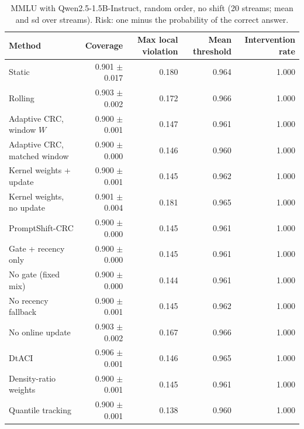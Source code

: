 \begin{table}[H]
\centering
\small
\caption{MMLU with Qwen2.5-1.5B-Instruct, random order, no shift (20 streams; mean and sd over streams). Risk: one minus the probability of the correct answer.}
\label{tab:mmlu_iid}
\begin{tabular}{lrrrr}
\toprule
Method & Coverage & Max local violation & Mean threshold & Intervention rate \\
\midrule
Static & 0.901 $\pm$ 0.017 & 0.180 & 0.964 & 1.000 \\
Rolling & 0.903 $\pm$ 0.002 & 0.172 & 0.966 & 1.000 \\
Adaptive CRC, window $W$ & 0.900 $\pm$ 0.001 & 0.147 & 0.961 & 1.000 \\
Adaptive CRC, matched window & 0.900 $\pm$ 0.000 & 0.146 & 0.960 & 1.000 \\
Kernel weights + update & 0.900 $\pm$ 0.001 & 0.145 & 0.962 & 1.000 \\
Kernel weights, no update & 0.901 $\pm$ 0.004 & 0.181 & 0.965 & 1.000 \\
PromptShift-CRC & 0.900 $\pm$ 0.000 & 0.145 & 0.961 & 1.000 \\
Gate + recency only & 0.900 $\pm$ 0.000 & 0.145 & 0.961 & 1.000 \\
No gate (fixed mix) & 0.900 $\pm$ 0.000 & 0.144 & 0.961 & 1.000 \\
No recency fallback & 0.900 $\pm$ 0.001 & 0.145 & 0.962 & 1.000 \\
No online update & 0.903 $\pm$ 0.002 & 0.167 & 0.966 & 1.000 \\
DtACI & 0.906 $\pm$ 0.001 & 0.146 & 0.965 & 1.000 \\
Density-ratio weights & 0.900 $\pm$ 0.001 & 0.145 & 0.961 & 1.000 \\
Quantile tracking & 0.900 $\pm$ 0.001 & 0.138 & 0.960 & 1.000 \\
\bottomrule
\end{tabular}
\end{table}


